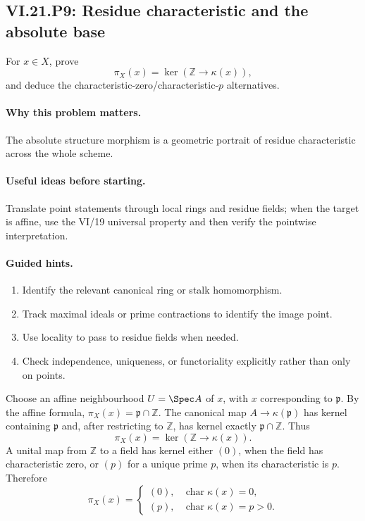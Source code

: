 \subsection*{VI.21.P9: Residue characteristic and the absolute base}
\begin{problem}\label{prob:vi21-p09}
For $x\in X$, prove
\[
\pi_X(x)=\ker(\mathbb Z\to\kappa(x)),
\]
and deduce the characteristic-zero/characteristic-$p$ alternatives.
\end{problem}

\ifdefined\FullProblemDossiers
\paragraph{Why this problem matters.}
The absolute structure morphism is a geometric portrait of residue characteristic across the whole scheme.

\paragraph{Useful ideas before starting.}
Translate point statements through local rings and residue fields; when the target is affine, use the VI/19 universal property and then verify the pointwise interpretation.

\paragraph{Guided hints.}
\begin{enumerate}
\item Identify the relevant canonical ring or stalk homomorphism.
\item Track maximal ideals or prime contractions to identify the image point.
\item Use locality to pass to residue fields when needed.
\item Check independence, uniqueness, or functoriality explicitly rather than only on points.
\end{enumerate}

\begin{solution}
Choose an affine neighbourhood $U=\Spec A$ of $x$, with $x$ corresponding to
$\mathfrak p$.  By the affine formula, $\pi_X(x)=\mathfrak p\cap\mathbb Z$.  The canonical map
$A\to\kappa(\mathfrak p)$ has kernel containing $\mathfrak p$ and, after restricting to
$\mathbb Z$, has kernel exactly $\mathfrak p\cap\mathbb Z$.  Thus
\[
\pi_X(x)=\ker(\mathbb Z\to\kappa(x)).
\]
A unital map from $\mathbb Z$ to a field has kernel either $(0)$, when the field has characteristic
zero, or $(p)$ for a unique prime $p$, when its characteristic is $p$.  Therefore
\[
\pi_X(x)=
\begin{cases}
(0),&\operatorname{char}\kappa(x)=0,\\
(p),&\operatorname{char}\kappa(x)=p>0.
\end{cases}
\]
\end{solution}


